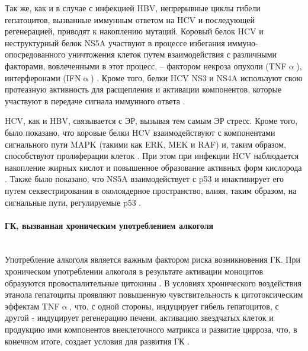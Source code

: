 Так же, как и в случае с инфекцией HBV, непрерывные циклы гибели гепатоцитов, вызванные иммунным ответом на HCV и последующей регенерацией, приводят к накоплению мутаций. Коровый белок HCV и неструктурный белок NS5A участвуют в процессе избегания иммуно-опосредованного уничтожения клеток путем взаимодействия с различными факторами, вовлеченными в этот процесс, – фактором некроза опухоли (TNF$\upalpha$), интерферонами (IFN$\upalpha$) \cite{farazi_hepatocellular_2006}. Кроме того, белки HCV NS3 и NS4A используют свою протеазную активность для расщепления и активации компонентов, которые участвуют в передаче сигнала иммунного ответа \cite{li_immune_2005}.

HCV, как и HBV, связывается с ЭР, вызывая тем самым ЭР стресс. Кроме того, было показано, что коровые белки HCV взаимодействуют с компонентами сигнального пути MAPK (такими как ERK, MEK и RAF) и, таким образом, способствуют пролиферации клеток \cite{macdonald_hepatitis_2003}. При этом при инфекции HCV наблюдается накопление жирных кислот и повышенное образование активных форм кислорода \cite{moriya_oxidative_2001}. Также было показано, что NS5A взаимодействует с p53 и инактивирует его путем секвестрирования в околоядерное пространство, влияя, таким образом, на сигнальные пути, регулируемые p53 \cite{farazi_hepatocellular_2006}. 

\paragraph{ГК, вызванная хроническим употреблением алкоголя}\mbox{}\\

Употребление алкоголя является важным фактором риска возникновения ГК. При хроническом употреблении алкоголя в результате активации моноцитов образуются провоспалительные цитокины \cite{mcclain_monocyte_2002}. В условиях хронического воздействия этанола гепатоциты проявляют повышенную чувствительность к цитотоксическим эффектам TNF$\upalpha$, что, с одной стороны, индуцирует гибель гепатоцитов, с другой - индуцирует регенерацию печени, активацию звездчатых клеток и продукцию ими компонентов внеклеточного матрикса и развитие цирроза, что, в конечном итоге, создает условия для развития ГК \cite{farazi_hepatocellular_2006}.

